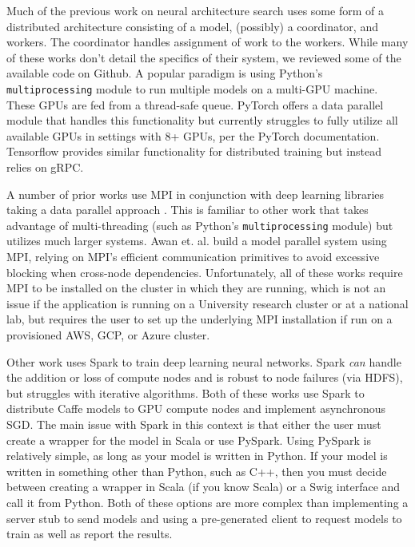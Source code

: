 \documentclass[conference]{IEEEtran}
\begin{document}
Much of the previous work on neural architecture search uses some form of a
distributed architecture consisting of a model, (possibly) a coordinator, and workers. The
coordinator handles assignment of work to the workers. While many of these works
don't detail the specifics of their system, we reviewed some of the available
code on Github. A popular paradigm is using Python's \texttt{multiprocessing}
module to run multiple models on a multi-GPU machine. These GPUs are fed from a
thread-safe queue. PyTorch offers a data parallel module that handles this
functionality  but currently struggles to fully utilize all available GPUs in
settings with 8+ GPUs, per the PyTorch documentation. Tensorflow provides similar
functionality for distributed training but instead relies on gRPC.

A number of prior works use MPI in conjunction with deep learning libraries
taking a data parallel approach \cite{Awan:2016:ELM:2966884.2966912,
  Awan:2017:SCM:3018743.3018769, pmlr-v28-coates13,
  DBLP:journals/corr/VishnuSD16}.  This is familiar to other work that takes
advantage of multi-threading (such as Python's \texttt{multiprocessing} module)
but utilizes much larger systems. Awan et. al.
\cite{Awan:2018:OBD:3236367.3236381} build a model parallel system using MPI,
relying on MPI's efficient communication primitives to avoid excessive blocking
when cross-node dependencies. Unfortunately, all of these works require MPI to
be installed on the cluster in which they are running, which is not an issue if
the application is running on a University research cluster or at a national
lab, but requires the user to set up the underlying MPI installation if run on a
provisioned AWS, GCP, or Azure cluster.

Other work \cite{journals/corr/MoritzNSJ15, journals/corr/KimPJY16} uses Spark
\cite{Zaharia:2016:ASU:3013530.2934664} to
train deep learning neural networks. Spark \emph{can} handle the addition or loss
of compute nodes and is robust to node failures (via HDFS), but struggles with
iterative algorithms. Both of these works use Spark to distribute Caffe
\cite{Jia:2014:CCA:2647868.2654889} models to GPU compute nodes
and implement asynchronous SGD. The main issue with Spark in this context
is that either the user must create a wrapper for the model in Scala or
use PySpark. Using PySpark is relatively simple, as long as your model is
written in Python. If your model is written in something other than Python,
such as C++, then you must decide between creating a wrapper in Scala
(if you know Scala) or a Swig interface and call it from Python. Both of
these options are more complex than implementing a server stub to send
models and using a pre-generated client to request models to train as well
as report the results.
\end{document}

